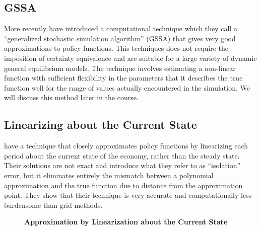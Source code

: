 \documentclass[letterpaper,12pt]{article}
\theoremstyle{definition}
\begin{document}
\begin{spacing}{1.5}
	\subsection{GSSA}\label{GSSA}
		More recently \citet{Juddetal2011} have introduced a computational technique which they call a ``generalized stochastic simulation algorithm'' (GSSA) that gives very good approximations to policy functions.  This techniques does not require the imposition of certainty equivalence and are suitable for a large variety of dynamic general equilibrium models.  The technique involves estimating a non-linear function with sufficient flexibility in the parameters that it describes the true function well for the range of values actually encountered in the simulation.  We will discuss this method later in the course.

	\subsection{Linearizing about the Current State}\label{CSL}
		\citet{EvansPhillips2014} have a technique that closely approximates policy functions by linearizing each period about the current state of the economy, rather than the steady state.  Their solutions are not exact and introduce what they refer to as ``isolation'' error, but it eliminates entirely the mismatch between a polynomial approximation and the true function due to distance from the approximation point.  They show that their technique is very accurate and computationally less burdensome than grid methods.

		\begin{figure}[htb]\centering \captionsetup{width=4.0in}
			\label{DSGE_CSL_Fig}
		   \caption{\textbf{Approximation by Linearization about the Current State}}
		\end{figure}


\end{spacing}
\end{document}
